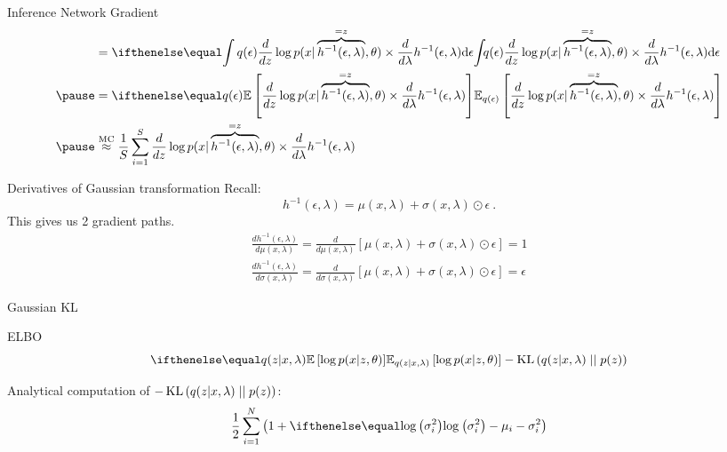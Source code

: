 \documentclass[14pt]{beamer}
\begin{document}
\begin{frame}{Inference Network Gradient}
\begin{equation*}
\begin{aligned}
&= \intl{q(\epsilon) \frac{d}{dz} \log p(x| \overbrace{h^{-1}(\epsilon, \lambda)}^{=z}, \theta) \times \frac{d}{d\lambda} h^{-1}(\epsilon, \lambda)}{\epsilon}  \\ \pause
&= \E[q(\epsilon)]{\frac{d}{dz} \log p(x| \overbrace{h^{-1}(\epsilon, \lambda)}^{=z}, \theta)\times \frac{d}{d\lambda} h^{-1}(\epsilon, \lambda)}\\ \pause
&\overset{\text{MC}}{\approx} \frac{1}{S}\sum_{i=1}^{S} \frac{d}{dz} \log p(x| \overbrace{h^{-1}(\epsilon, \lambda)}^{=z}, \theta) \times \frac{d}{d\lambda} h^{-1}(\epsilon, \lambda)
\end{aligned}
\end{equation*}
\end{frame}

\begin{frame}{Derivatives of Gaussian transformation}
Recall:
$$ h^{-1}(\epsilon, \lambda) = \mu(x,\lambda) + \sigma(x,\lambda) \odot \epsilon \ . $$
\pause
This gives us 2 gradient paths.
\pause
\begin{align*}
\frac{d h^{-1}(\epsilon, \lambda)}{d\mu(x,\lambda)} = \frac{d}{d\mu(x,\lambda)}\left[ \mu(x,\lambda) + \sigma(x,\lambda) \odot \epsilon \right] = 1 \\
\frac{d h^{-1}(\epsilon, \lambda)}{d\sigma(x,\lambda)} = \frac{d}{d\sigma(x,\lambda)}\left[ \mu(x,\lambda) + \sigma(x,\lambda) \odot \epsilon \right] = \epsilon
\end{align*}
\end{frame}

\begin{frame}{Gaussian KL}
\begin{block}{ELBO}
\begin{equation*}
\E[q(z|x,\lambda)]{\log p(x|z,\theta)} - \KL{q(z|x,\lambda)}{p(z)}
\end{equation*}
\end{block}
\pause
Analytical computation of $ -\operatorname{KL}\left(q(z|x,\lambda)\mid\mid p(z)\right) $:
\begin{equation*}
\frac{1}{2}\sum_{i=1}^{N}\left(1 + \loga{\sigma^{2}_{i}} -
\mu_i - \sigma^{2}_{i} \right)
\end{equation*}
\end{frame}
\end{document}
